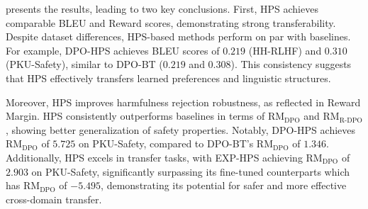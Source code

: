  presents the results, leading to two key conclusions. First, HPS achieves comparable BLEU and Reward scores, demonstrating strong transferability. Despite dataset differences, HPS-based methods perform on par with baselines. For example, DPO-HPS achieves BLEU scores of $0.219$ (HH-RLHF) and $0.310$ (PKU-Safety), similar to DPO-BT ($0.219$ and $0.308$). This consistency suggests that HPS effectively transfers learned preferences and linguistic structures.   

\vspace{-1.5pt}

Moreover, HPS improves harmfulness rejection robustness, as reflected in Reward Margin. HPS consistently outperforms baselines in terms of  $\text{RM}_{\text{DPO}}$ and $\text{RM}_{\text{R-DPO}}$, showing better generalization of safety properties. Notably, DPO-HPS achieves $\text{RM}_{\text{DPO}}$ of $5.725$ on PKU-Safety, compared to DPO-BT’s $\text{RM}_{\text{DPO}}$ of $1.346$. Additionally, HPS excels in transfer tasks, with EXP-HPS achieving $\text{RM}_{\text{DPO}}$ of $2.903$ on PKU-Safety, significantly surpassing its fine-tuned counterparts which has $\text{RM}_{\text{DPO}}$ of $-5.495$, demonstrating its potential for safer and more effective cross-domain transfer.


